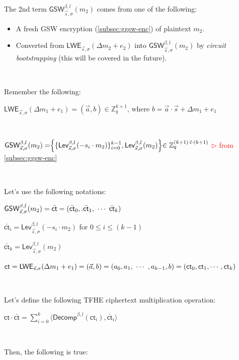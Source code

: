 $ $

\noindent The 2nd term $\textsf{GSW}_{\vec{s}, \sigma}^{\beta, l}(m_2)$ comes from one of the following:
\begin{itemize}
\item A fresh GSW encryption (\autoref{subsec:ggsw-enc}) of plaintext $m_2$.
\item Converted from $\textsf{LWE}_{\vec{s}, \sigma}(\Delta m_2 + e_2)$ into $\textsf{GSW}_{\vec{s}, \sigma}^{\beta, l}(m_2)$ by \textit{circuit bootstrapping} (this will be covered in the future).
\end{itemize}

$ $

\noindent Remember the following: 

$\textsf{LWE}_{\vec{s}, \sigma}(\Delta m_1 + e_1) = (\vec{a}, b) \in \mathbb{Z}_{q}^{k + 1}$, where $b = \vec{a} \cdot \vec{s} + \Delta m_1 + e_1$ 

$ $

$\textsf{GSW}_{\vec{s}, \sigma}^{\beta, l}(m_2) = \Bigr \{ \{ \textsf{Lev}_{\vec{s}, \sigma}^{\beta, l} (-s_i \cdot m_2)  \}_{i=0}^{k-1}, \textsf{Lev}_{\vec{s}, \sigma}^{\beta, l}(m_2) \Bigl \} \in \mathbb{Z}_{q }^{(k+1) \cdot l \cdot (k+1)}$ \textcolor{red}{ $\rhd$ from \autoref{subsec:ggsw-enc}}

$ $

\noindent Let's use the following notations:

$\textsf{GSW}_{\vec{s}, \sigma}^{\beta, l}(m_2) = {\bar{\textsf{ct}}} = (\bar{\textsf{ct}}_0,. \bar{\textsf{ct}}_1, \text{ } \text{$\cdots$} \text{ } \bar{\textsf{ct}}_k)$ 

$\bar{\textsf{ct}}_i = \textsf{Lev}_{\vec{s}, \sigma}^{\beta, l}(-s_i \cdot m_2)$ for $0 \leq i \leq (k-1)$

$\bar{\textsf{ct}}_k = \textsf{Lev}_{\vec{s}, \sigma}^{\beta, l}(m_2)$

$\textsf{ct} = \textsf{LWE}_{\vec{s}, \sigma}(\Delta m_1 + e_1) = (\vec{a}, b) = (a_0, a_1, \text{ } \text{$\cdots$} \text{ }, a_{k-1}, b) = (\textsf{ct}_0, \textsf{ct}_1, \cdots, \textsf{ct}_k)$

$ $

\noindent Let's define the following TFHE ciphertext multiplication operation: 

$\textsf{ct} \cdot {\bar{\textsf{ct}}} = \sum\limits_{i=0}^{k}\langle \textsf{Decomp}^{\beta, l}(\textsf{ct}_i), \bar{\textsf{ct}}_i \rangle$

$ $

\noindent Then, the following is true:

